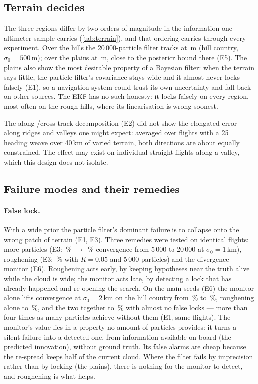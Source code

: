 \subsection{Terrain decides}
The three regions differ by two orders of magnitude in the information one altimeter sample
carries (\cref{tab:terrain}), and that ordering carries through every experiment. Over the hills
the 20\,000-particle filter tracks at \EOneHillSFiveZeroZeroPfTwoZeroZeroZeroZeroTrack\,m (hill country,
$\sigma_0 = 500$\,m); over the plains at \EOnePlainsSFiveZeroZeroPfTwoZeroZeroZeroZeroTrack\,m, close to the posterior
bound there (E5). The plains also show the most desirable property of a Bayesian filter: when the
terrain says little, the particle filter's covariance stays wide and it almost never locks
falsely (E1), so a navigation system could trust its own uncertainty and fall back on other
sources. The EKF has no such honesty: it locks falsely on every region, most often on the rough
hills, where its linearisation is wrong soonest.

The along-/cross-track decomposition (E2) did not show the elongated error along ridges and valleys
one might expect: averaged over flights with a 25$^\circ$ heading weave over 40\,km of varied
terrain, both directions are about equally constrained. The effect may exist on individual straight
flights along a valley, which this design does not isolate.

\subsection{Failure modes and their remedies}
\paragraph{False lock.} With a wide prior the particle filter's dominant failure is to collapse onto
the wrong patch of terrain (E1, E3). Three remedies were tested on identical flights: more particles
(E3: \EThreeNFiveKConv\,\% $\to$ \EThreeNTwentyKConv\,\% convergence from 5\,000 to 20\,000 at
$\sigma_0 = 1$\,km), roughening (E3: \EThreeRoughZeroPointZeroFiveConv\,\% with $K = 0.05$ and
5\,000 particles) and the divergence monitor (E6). Roughening acts early, by keeping
hypotheses near the truth alive while the cloud is wide; the monitor acts late, by detecting a lock
that has already happened and re-opening the search.
On the main seeds (E6) the monitor alone lifts convergence at $\sigma_0 = 2$\,km on the hill
country from \ESixHillSTwoZeroZeroZeroPfFiveZeroZeroZeroConv\,\% to
\ESixHillSTwoZeroZeroZeroPfMonitorConv\,\%, roughening alone to
\ESixHillSTwoZeroZeroZeroPfRoughConv\,\%, and the two together to
\ESixHillSTwoZeroZeroZeroPfMonitorRoughConv\,\% with almost no false locks --- more than four
times as many particles achieve without them (E1, same flights). The monitor's value lies in a property no amount of
particles provides: it turns a silent failure into a detected one, from information available on
board (the predicted innovation), without ground truth. Its false alarms are cheap because the
re-spread keeps half of the current cloud. Where the filter fails by imprecision rather than by
locking (the plains), there is nothing for the monitor to detect, and roughening is what helps.

